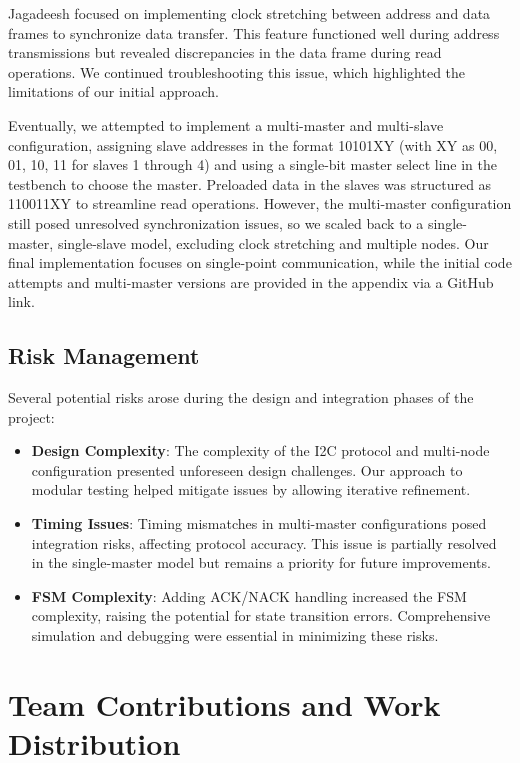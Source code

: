 \documentclass[a4paper,12pt]{report}
\begin{document}
\vspace{0.5in}

Jagadeesh focused on implementing clock stretching between address and data frames to synchronize data transfer. This feature functioned well during address transmissions but revealed discrepancies in the data frame during read operations. We continued troubleshooting this issue, which highlighted the limitations of our initial approach.

\vspace{0.75in}

Eventually, we attempted to implement a multi-master and multi-slave configuration, assigning slave addresses in the format 10101XY (with XY as 00, 01, 10, 11 for slaves 1 through 4) and using a single-bit master select line in the testbench to choose the master. Preloaded data in the slaves was structured as 110011XY to streamline read operations. However, the multi-master configuration still posed unresolved synchronization issues, so we scaled back to a single-master, single-slave model, excluding clock stretching and multiple nodes. Our final implementation focuses on single-point communication, while the initial code attempts and multi-master versions are provided in the appendix via a GitHub link.
\newpage
\section{Risk Management}
Several potential risks arose during the design and integration phases of the project:
\begin{itemize}
    \item \textbf{Design Complexity}: The complexity of the I2C protocol and multi-node configuration presented unforeseen design challenges. Our approach to modular testing helped mitigate issues by allowing iterative refinement.
    \item \textbf{Timing Issues}: Timing mismatches in multi-master configurations posed integration risks, affecting protocol accuracy. This issue is partially resolved in the single-master model but remains a priority for future improvements.
    \item \textbf{FSM Complexity}: Adding ACK/NACK handling increased the FSM complexity, raising the potential for state transition errors. Comprehensive simulation and debugging were essential in minimizing these risks.
\end{itemize}
\newpage
\chapter{Team Contributions and Work Distribution}
\end{document}
